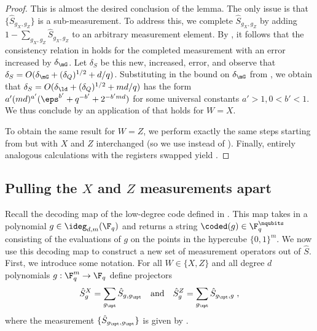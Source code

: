 \begin{proof}
        This is almost the desired conclusion of the lemma. The only issue is that $\{\hat{S}_{g_X, g_Z}\}$ is a sub-measurement. To address this, we complete $\hat{S}_{g_X, g_Z}$ by adding $1 - \sum_{g_X, g_Z} \hat{S}_{g_X, g_Z}$ to an arbitrary measurement element. By , it follows that the consistency relation in  holds for the completed measurement with an error increased by $\delta_{\mG}$. Let $\delta_S$ be this new, increased, error, and observe that $\delta_S = O(\delta_{\mG} + (\delta_Q)^{1/2} + d/q)$. Substituting in the bound on $\delta_{\mG}$ from , we obtain that $\delta_S = O(\delta_\ld + (\delta_Q)^{1/2} + md/q)$ has the form $a' (md)^{a'} (\eps^{b'} + q^{-b'} + 2^{-b'md})$ for some universal constants $a' > 1, 0 < b' < 1$. We thus conclude by an application of  that  holds for $W = X$.

        To obtain the same result for $W = Z$, we perform exactly the same steps starting from  but with $X$ and $Z$ interchanged (so we use  instead of ). Finally, entirely analogous calculations with the registers swapped yield .

        




	
	
\end{proof}

 \subsection{Pulling the $X$ and $Z$ measurements apart}
\label{sec:separating}


Recall the decoding map of the low-degree code defined in . This map takes in a polynomial $g \in \ideg_{d,m}(\F_q)$ and returns a string $\coded(g) \in \F_q^{\nqubits}$ consisting of the evaluations of $g$ on the points in the hypercube $\{0,1\}^m$.
We now use this decoding map to construct a new set of measurement operators out of $\hat{S}$.
First, we introduce some notation. For all $W \in \{X,Z\}$ and all degree $d$ polynomials $g: \F_q^m \to \F_q$ define projectors
\[ \hat{S}^X_g = \sum_{g_\zpt} \hat{S}_{g,g_\zpt} \quad  \text{and}  \quad \hat{S}^Z_g = \sum_{g_\xpt} \hat{S}_{g_\xpt,g}\;,\]
where the measurement $\{\hat{S}_{g_\xpt,g_\zpt} \}$  is given by .

